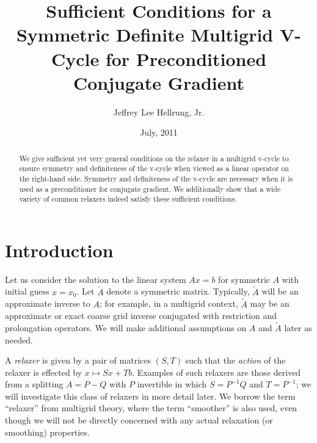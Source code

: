 \documentclass{article}
\title{Sufficient Conditions for a Symmetric Definite Multigrid V-Cycle for Preconditioned Conjugate Gradient}
\date{July, 2011}
\author{Jeffrey Lee Hellrung, Jr.}
\begin{document}
\maketitle

\begin{abstract}
We give sufficient yet very general conditions on the relaxer in a multigrid v-cycle to ensure symmetry and definiteness of the v-cycle when viewed as a linear operator on the right-hand side. Symmetry and definiteness of the v-cycle are necessary when it is used as a preconditioner for conjugate gradient. We additionally show that a wide variety of common relaxers indeed satisfy these sufficient conditions.
\end{abstract}

\section{Introduction}

Let us consider the solution to the linear system $A x = b$ for symmetric $A$ with initial guess $x = x_0$. Let $\widetilde{A}$ denote a symmetric matrix. Typically, $\widetilde{A}$ will be an approximate inverse to $A$; for example, in a multigrid context, $\widetilde{A}$ may be an approximate or exact coarse grid inverse conjugated with restriction and prolongation operators. We will make additional assumptions on $A$ and $\widetilde{A}$ later as needed.

A \emph{relaxer} is given by a pair of matrices $\left( S, T \right)$ such that the \emph{action} of the relaxer is effected by $x \mapsto S x + T b$. Examples of such relaxers are those derived from a splitting $A = P - Q$ with $P$ invertible in which $S = P^{-1} Q$ and $T = P^{-1}$; we will investigate this class of relaxers in more detail later. We borrow the term ``relaxer'' from multigrid theory, where the term ``smoother'' is also used, even though we will not be directly concerned with any actual relaxation (or smoothing) properties.
\end{document}
